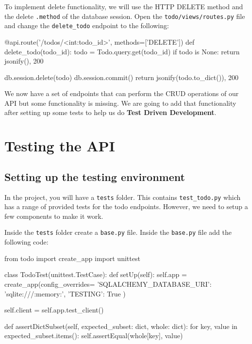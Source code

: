 \documentclass{csse4400}
\begin{document}
To implement delete functionality, we will use the HTTP DELETE method and the delete \texttt{.method} of the database session.
Open the \texttt{todo/views/routes.py} file and change the \texttt{delete\_todo} endpoint to the following:

\begin{code}[language=python,numbers=none]{}
@api.route('/todos/<int:todo_id>', methods=['DELETE'])
def delete_todo(todo_id):
    todo = Todo.query.get(todo_id)
    if todo is None:
        return jsonify({}), 200

    db.session.delete(todo)
    db.session.commit()
    return jsonify(todo.to_dict()), 200
\end{code}

We now have a set of endpoints that can perform the CRUD operations of our API but some functionality is missing.
We are going to add that functionality after setting up some tests to help us do \textbf{Test Driven Development}.


\section{Testing the API}

\subsection{Setting up the testing environment}

In the project, you will have a \texttt{tests} folder.
This contains \texttt{test\_todo.py} which has a range of provided tests for the todo endpoints.
However, we need to setup a few components to make it work.

Inside the \texttt{tests} folder create a \texttt{base.py} file. Inside the \texttt{base.py} file add the following code:

\begin{code}[language=python,numbers=none]{}
  from todo import create_app
  import unittest
  
  class TodoTest(unittest.TestCase):
      def setUp(self):
          self.app = create_app(config_overrides={
              'SQLALCHEMY_DATABASE_URI': 'sqlite:///:memory:',
              'TESTING': True
          })
  
          self.client = self.app.test_client()
  
      def assertDictSubset(self, expected_subset: dict, whole: dict):
          for key, value in expected_subset.items():
              self.assertEqual(whole[key], value)
\end{code}
\end{document}
